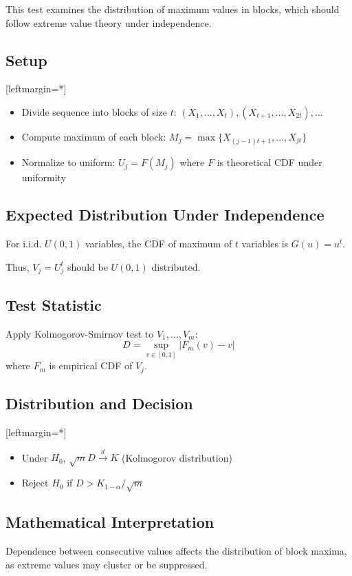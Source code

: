 \documentclass[12pt]{article}
\begin{document}
This test examines the distribution of maximum values in blocks, which should follow extreme value theory under independence.

\subsection*{Setup}
[leftmargin=*] \begin{itemize}
    \item Divide sequence into blocks of size $t$: $(X_1, \dots, X_t), (X_{t+1}, \dots, X_{2t}), \dots$
    \item Compute maximum of each block: $M_j = \max\{X_{(j-1)t+1}, \dots, X_{jt}\}$
    \item Normalize to uniform: $U_j = F(M_j)$ where $F$ is theoretical CDF under uniformity
\end{itemize}

\subsection*{Expected Distribution Under Independence}
For i.i.d. $U(0,1)$ variables, the CDF of maximum of $t$ variables is $G(u) = u^t$.

Thus, $V_j = U_j^t$ should be $U(0,1)$ distributed.

\subsection*{Test Statistic}
Apply Kolmogorov-Smirnov test to $V_1, \dots, V_m$:
\[
D = \sup_{v \in [0,1]} |F_m(v) - v|
\]
where $F_m$ is empirical CDF of $V_j$.

\subsection*{Distribution and Decision}
[leftmargin=*]\begin{itemize}
    \item Under $H_0$, $\sqrt{m}D \xrightarrow{d} K$ (Kolmogorov distribution)
    \item Reject $H_0$ if $D > K_{1-\alpha}/\sqrt{m}$
\end{itemize}
\subsection*{Mathematical Interpretation}
Dependence between consecutive values affects the distribution of block maxima, as extreme values may cluster or be suppressed.
\end{document}
